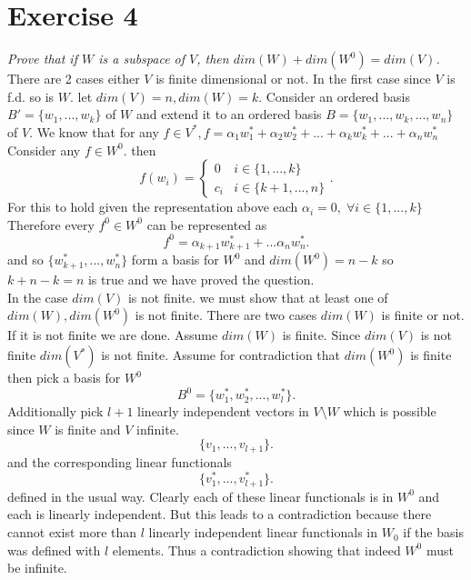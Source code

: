 \documentclass{article}
\begin{document}
    \section{Exercise 4}
    \emph{
        Prove that if $W$ is a subspace of $V$, then $dim(W) + dim(W^{0}) = dim(V)$.
    }
    There are 2 cases either $V$ is finite dimensional or not. In the first case since $V$ is f.d. so is $W$. let $dim(V) = n, dim(W) = k$.
    Consider an ordered basis $B' = \{w_1,...,w_k\}$ of $W$ and extend it to an ordered basis $B = \{w_1,...,w_k,...,w_n\}$ of $V$. We know
    that for any $f \in V^{*}, f = \alpha_1w_1^{*} + \alpha_2w_2^{*} + ... + \alpha_kw_k^{*} + ... + \alpha_nw_n^{*}$ Consider any $f \in W^{0}$.
    then
    \[
    f(w_i) =
    \begin{cases}
        0 & i \in \{1,...,k\}\\
        c_i & i \in \{k+1,...,n\}
    \end{cases}
    .\] 
    For this to hold given the representation above each $\alpha_i = 0, \; \forall i \in \{1,...,k\}$
    Therefore every $f^{0} \in W^{0}$ can be represented as 
    \[
        f^{0} = \alpha_{k+1}w_{k+1}^{*} + ... \alpha_nw_n^{*}
    .\] 
    and so $\{w_{k+1}^{*}, ..., w_n^{*}\}$ form a basis for $W^{0}$ and $dim(W^{0}) = n-k$ so $k + n-k = n$ is true and we have proved the question.\\
    In the case $dim(V)$ is not finite. we must show that at least one of $dim(W), dim(W^{0})$ is not finite. There are two cases
    $dim(W)$ is finite or not. If it is not finite we are done. Assume $dim(W)$ is finite. Since $dim(V)$  is not finite $dim(V^{*})$ is not
    finite. Assume for contradiction that $dim(W^{0})$ is finite then pick a basis for $W^{0}$
    \[
        B^{0} = \{w_1^{*}, w_2^{*},...,w_l^{*}\}
    .\] 
    Additionally pick $l+1$ linearly independent vectors in $V \setminus W$  which is possible since $W$ is finite and $V$ infinite.
    \[
        \{v_1,...,v_{l+1}\}
    .\] 
    and the corresponding linear functionals  
    \[
        \{v_1^{*},...,v_{l+1}^{*}\}
    .\] 
    defined in the usual way. Clearly each of these linear functionals is in $W^{0}$ and each is linearly independent.
    But this leads to a contradiction because there cannot exist more than $l$ linearly independent linear functionals in $W_0$ if the basis was defined with $l$ elements. Thus
    a contradiction showing that indeed $W^{0}$ must be infinite.
\end{document}

